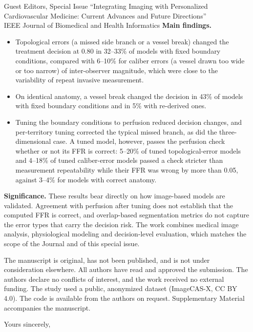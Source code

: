 \documentclass[10pt]{letter}
\begin{document}
\begin{letter}{Guest Editors, Special Issue ``Integrating Imaging with Personalized Cardiovascular Medicine: Current
Advances and Future Directions''\\IEEE Journal of Biomedical and Health Informatics}
\textbf{Main findings.}
\begin{itemize}
\item Topological errors (a missed side branch or a vessel break) changed the treatment decision at 0.80 in 32--33\%
of models with fixed boundary conditions, compared with 6--10\% for caliber errors (a vessel drawn too wide or too narrow) of inter-observer magnitude, which
were close to the variability of repeat invasive measurement.
\item On identical anatomy, a vessel break changed the decision in 43\% of models with fixed boundary conditions and
in 5\% with re-derived ones.
\item Tuning the boundary conditions to perfusion reduced decision changes, and per-territory tuning corrected the
typical missed branch, as did the three-dimensional case. A tuned model, however, passes the perfusion check whether
or not its FFR is correct: 5--20\% of tuned topological-error models and 4--18\% of tuned caliber-error models passed
a check stricter than measurement repeatability while their FFR was wrong by more than 0.05, against 3--4\% for
models with correct anatomy.
\end{itemize}

\textbf{Significance.} These results bear directly on how image-based models are validated. Agreement with
perfusion after tuning does not establish that the computed FFR is correct, and overlap-based segmentation metrics do not capture the error types that
carry the decision risk. The work combines medical image analysis, physiological modeling and decision-level
evaluation, which matches the scope of the Journal and of this special issue. 

The manuscript is original, has not been published, and is not under consideration elsewhere. All authors have read
and approved the submission. The authors declare no conflicts of interest, and the work received no external funding.
The study used a public, anonymized dataset (ImageCAS-X, CC BY 4.0). The code is available from the authors on request. Supplementary Material accompanies the manuscript.

\closing{Yours sincerely,}
\end{letter}
\end{document}
